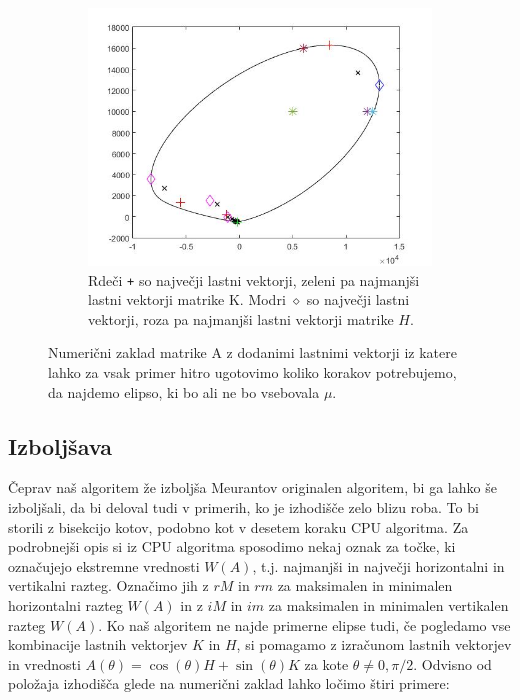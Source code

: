 \documentclass[12pt,a4paper]{amsart}
\theoremstyle{definition}
\theoremstyle{plain}
\begin{document}
\begin{figure}[H]
\begin{subfigure}[t]{0.5\textwidth}
\end{subfigure}%
\hfill
\begin{subfigure}[t]{0.5\textwidth}
\includegraphics[width=0.9\linewidth]{CCC.jpg}
\caption{Rdeči \verb~+~ so največji lastni vektorji, zeleni pa najmanjši lastni vektorji matrike K. Modri $\diamond$ so največji lastni vektorji, roza pa najmanjši lastni vektorji matrike $H$.\footnotemark[\value{footnote}]}
\end{subfigure}
\caption{Numerični zaklad matrike A z dodanimi lastnimi vektorji iz katere lahko za vsak primer hitro ugotovimo koliko korakov potrebujemo, da najdemo elipso, ki bo ali ne bo vsebovala $\mu$.}
\label{fig:p7}
\end{figure}

\subsection{Izboljšava}
Čeprav naš algoritem že izboljša Meurantov originalen algoritem, bi ga lahko še izboljšali, da bi deloval tudi v primerih, ko je izhodišče zelo blizu roba.
To bi storili z bisekcijo kotov, podobno kot v desetem koraku CPU algoritma.
Za podrobnejši opis si iz CPU algoritma sposodimo nekaj oznak za točke, ki označujejo ekstremne vrednosti $W(A)$, t.j. najmanjši in največji horizontalni in vertikalni razteg. 
Označimo jih z $rM$ in $rm$ za maksimalen in minimalen horizontalni razteg $W(A)$ in z $iM$ in $im$ za maksimalen in minimalen vertikalen razteg $W(A)$.
Ko naš algoritem ne najde primerne elipse tudi, če pogledamo vse kombinacije lastnih vektorjev $K$ in $H$, si pomagamo z izračunom lastnih vektorjev in vrednosti $A(\theta)=\cos(\theta)H+\sin(\theta)K$ za kote $\theta \not =0,\pi/2$.
Odvisno od položaja izhodišča glede na numerični zaklad lahko ločimo štiri primere:
\end{document}

